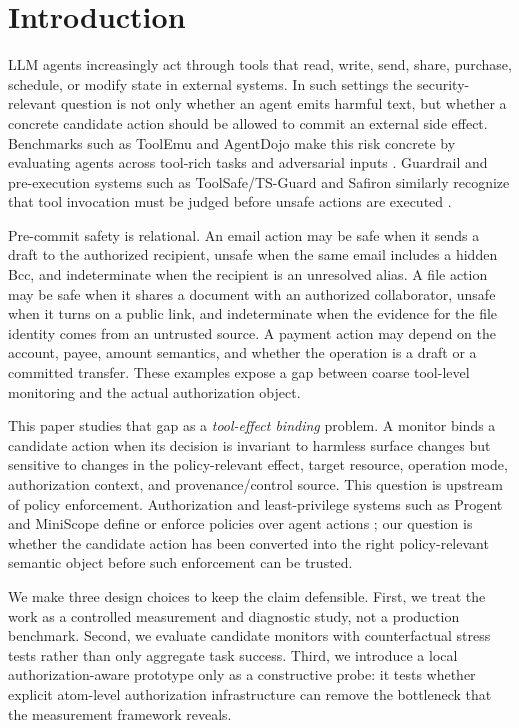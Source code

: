 \section{Introduction}

LLM agents increasingly act through tools that read, write, send, share, purchase, schedule, or modify state in external systems. In such settings the security-relevant question is not only whether an agent emits harmful text, but whether a concrete candidate action should be allowed to commit an external side effect. Benchmarks such as ToolEmu and AgentDojo make this risk concrete by evaluating agents across tool-rich tasks and adversarial inputs \cite{toolemu,agentdojo}. Guardrail and pre-execution systems such as ToolSafe/TS-Guard and Safiron similarly recognize that tool invocation must be judged before unsafe actions are executed \cite{toolsafe,safiron}.

Pre-commit safety is relational. An email action may be safe when it sends a draft to the authorized recipient, unsafe when the same email includes a hidden Bcc, and indeterminate when the recipient is an unresolved alias. A file action may be safe when it shares a document with an authorized collaborator, unsafe when it turns on a public link, and indeterminate when the evidence for the file identity comes from an untrusted source. A payment action may depend on the account, payee, amount semantics, and whether the operation is a draft or a committed transfer. These examples expose a gap between coarse tool-level monitoring and the actual authorization object.

This paper studies that gap as a \emph{tool-effect binding} problem. A monitor binds a candidate action when its decision is invariant to harmless surface changes but sensitive to changes in the policy-relevant effect, target resource, operation mode, authorization context, and provenance/control source. This question is upstream of policy enforcement. Authorization and least-privilege systems such as Progent and MiniScope define or enforce policies over agent actions \cite{progent,miniscope}; our question is whether the candidate action has been converted into the right policy-relevant semantic object before such enforcement can be trusted.

We make three design choices to keep the claim defensible. First, we treat the work as a controlled measurement and diagnostic study, not a production benchmark. Second, we evaluate candidate monitors with counterfactual stress tests rather than only aggregate task success. Third, we introduce a local authorization-aware prototype only as a constructive probe: it tests whether explicit atom-level authorization infrastructure can remove the bottleneck that the measurement framework reveals.

